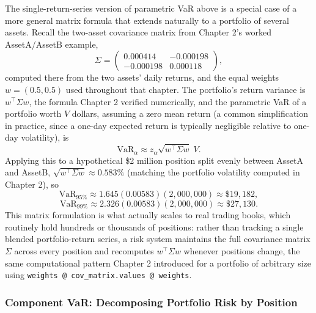 \documentclass[../ai_in_finance]{subfiles}
\begin{document}
The single-return-series version of parametric VaR above is a special case of a more general matrix formula that extends naturally to a portfolio of several assets. Recall the two-asset covariance matrix from Chapter 2's worked AssetA/AssetB example,
\begin{equation*}
\Sigma = \begin{pmatrix} 0.000414 & -0.000198 \\ -0.000198 & 0.000118 \end{pmatrix},
\end{equation*}
computed there from the two assets' daily returns, and the equal weights $w = (0.5, 0.5)$ used throughout that chapter. The portfolio's return variance is $w^\top \Sigma w$, the formula Chapter 2 verified numerically, and the parametric VaR of a portfolio worth $V$ dollars, assuming a zero mean return (a common simplification in practice, since a one-day expected return is typically negligible relative to one-day volatility), is
\begin{equation*}
\text{VaR}_\alpha \approx z_\alpha \sqrt{w^\top \Sigma w}\; V.
\end{equation*}
Applying this to a hypothetical \$2 million position split evenly between AssetA and AssetB, $\sqrt{w^\top \Sigma w} \approx 0.583\%$ (matching the portfolio volatility computed in Chapter 2), so
\begin{equation*}
\text{VaR}_{95\%} \approx 1.645(0.00583)(2{,}000{,}000) \approx \$19{,}182,
\end{equation*}
\begin{equation*}
\text{VaR}_{99\%} \approx 2.326(0.00583)(2{,}000{,}000) \approx \$27{,}130.
\end{equation*}
This matrix formulation is what actually scales to real trading books, which routinely hold hundreds or thousands of positions: rather than tracking a single blended portfolio-return series, a risk system maintains the full covariance matrix $\Sigma$ across every position and recomputes $w^\top \Sigma w$ whenever positions change, the same computational pattern Chapter 2 introduced for a portfolio of arbitrary size using \texttt{weights @ cov\_matrix.values @ weights}.

\subsubsection*{Component VaR: Decomposing Portfolio Risk by Position}
\end{document}

